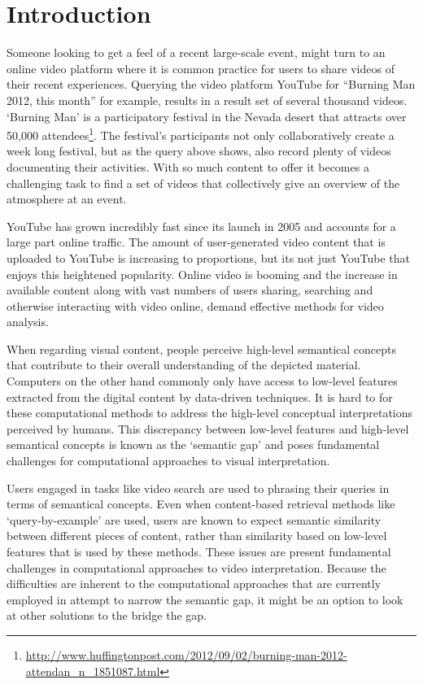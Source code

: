 \chapter{Introduction}
\label{ch:introduction}

Someone looking to get a feel of a recent large-scale event, might turn to an online video platform where it is common practice for users to share videos of their recent experiences\cite{Cha:2007ty,Cheng:2007tc}. Querying the video platform YouTube for ``Burning Man 2012, this month'' for example, results in a result set of several thousand videos\cite{youtubeBM}. `Burning Man' is a participatory festival in the Nevada desert that attracts over 50,000 attendees\footnote{\url{http://www.huffingtonpost.com/2012/09/02/burning-man-2012-attendan_n_1851087.html}}. The festival's participants not only collaboratively create  a week long festival, but as the query above shows, also record plenty of videos documenting their activities. With so much content to offer it becomes a challenging task to find a set of videos that collectively give an overview of the atmosphere at an event.

YouTube has grown incredibly fast since its launch in 2005 and accounts for a large part online traffic\cite{Cheng:2007tc}. The amount of user-generated video content that is uploaded to YouTube is increasing to proportions, but its not just YouTube that enjoys this heightened popularity. Online video is booming and the increase in available content along with vast numbers of users sharing, searching and otherwise interacting with video online, demand effective methods for video analysis.

When regarding visual content, people perceive high-level semantical concepts that contribute to their overall understanding of the depicted material. Computers on the other hand commonly only have access to low-level features extracted from the digital content by data-driven techniques. It is hard to for these computational methods to address the high-level conceptual interpretations perceived by humans. This discrepancy between low-level features and high-level semantical concepts is known as the `semantic gap'\cite{Smeulders:2000tx} and poses fundamental challenges for computational approaches to visual interpretation.

Users engaged in tasks like video search are used to phrasing their queries in terms of semantical concepts. Even when content-based retrieval methods like `query-by-example' are used, users are known to expect semantic similarity between different pieces of content, rather than similarity based on low-level features that is used by these methods\cite{Worring:2007vm, Snoek:jf, Hollink:2005ei}. These issues are present fundamental challenges in computational approaches to video interpretation. Because the difficulties are inherent to the computational approaches that are currently employed in attempt to narrow the semantic gap, it might be an option to look at other solutions to the bridge the gap.


